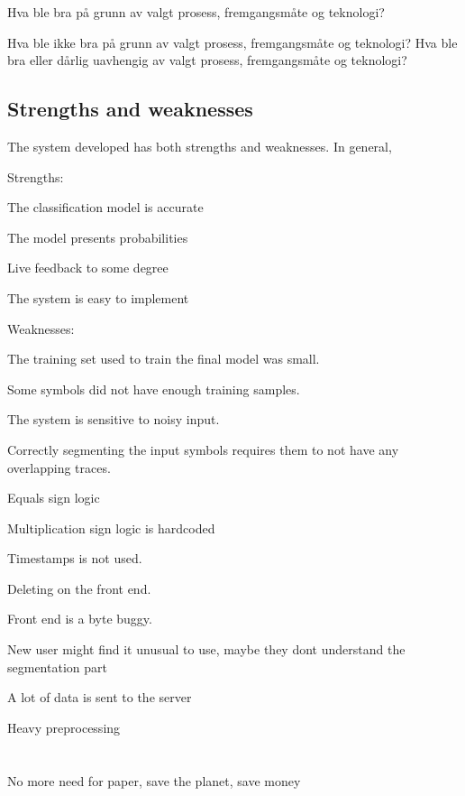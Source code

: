 Hva ble bra på grunn av valgt prosess, fremgangsmåte og teknologi? 



Hva ble ikke bra på grunn av valgt prosess, fremgangsmåte og teknologi? 
Hva ble bra eller dårlig uavhengig av valgt prosess, fremgangsmåte og teknologi?

\subsection{Strengths and weaknesses}

The system developed has both strengths and weaknesses. In general, 

Strengths:

The classification model is accurate

The model presents probabilities

Live feedback to some degree

The system is easy to implement


Weaknesses:

The training set used to train the final model was small.

Some symbols did not have enough training samples.

The system is sensitive to noisy input. 

Correctly segmenting the input symbols requires them to not have any overlapping traces.

Equals sign logic

Multiplication sign logic is hardcoded

Timestamps is not used.

Deleting on the front end.

Front end is a byte buggy.

New user might find it unusual to use, maybe they dont understand the segmentation part

A lot of data is sent to the server

Heavy preprocessing




\section{}



No more need for paper, save the planet, save money

